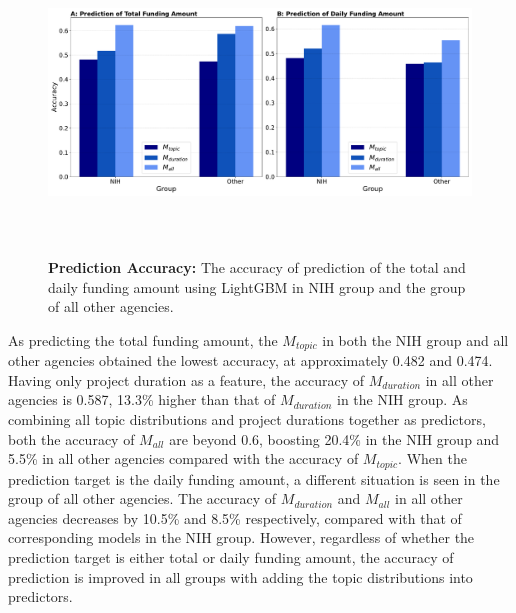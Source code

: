 \begin{figure}[H]
    \centering
    \includegraphics[width = 17cm, height = 8cm]{./img/accuracy_daily.pdf}
    \caption[The accuracy of prediction of funding amount using LightGBM]{\textbf{Prediction Accuracy:} The accuracy of prediction of the total and daily funding amount using LightGBM in NIH group and the group of all other agencies.}
\end{figure}

As predicting the total funding amount, the $M_{topic}$ in both the NIH group and all other agencies obtained the lowest accuracy, at approximately 0.482 and 0.474. Having only project duration as a feature, the accuracy of $M_{duration}$ in all other agencies is 0.587, 13.3\% higher than that of $M_{duration}$ in the NIH group. As combining all topic distributions and project durations together as predictors, both the accuracy of $M_{all}$ are beyond 0.6, boosting 20.4\% in the NIH group and 5.5\% in all other agencies compared with the accuracy of $M_{topic}$. When the prediction target is the daily funding amount, a different situation is seen in the group of all other agencies. The accuracy of $M_{duration}$ and $M_{all}$ in all other agencies decreases by 10.5\% and 8.5\% respectively, compared with that of corresponding models in the NIH group. However, regardless of whether the prediction target is either total or daily funding amount, the accuracy of prediction is improved in all groups with adding the topic distributions into predictors.
